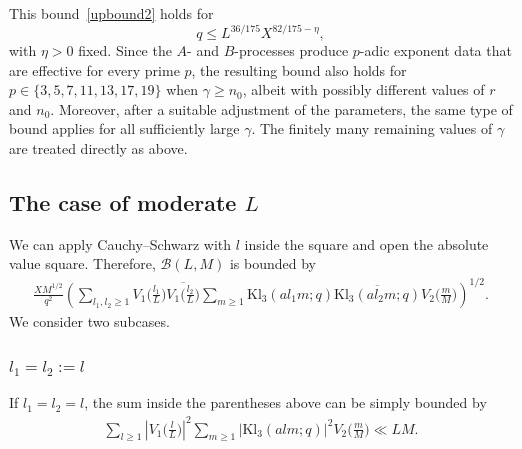 \documentclass[11pt,reqno]{amsart}
\newcommand{\bea}{\begin{eqnarray}}
\newcommand{\eea}{\end{eqnarray}}
\numberwithin{equation}{section}
\theoremstyle{plain}
\theoremstyle{definition}
\begin{document}
This bound~\eqref{upbound2} holds for
$$q \leq L^{36/175}X^{82/175-\eta},$$
with $\eta>0$ fixed.
Since the $A$- and $B$-processes produce $p$-adic exponent data that are effective for every prime $p$, 
the resulting bound also holds for $p\in\{3,5,7, 11, 13,17,19\}$ when $\gamma \geqslant n_0$, 
albeit with possibly different values of $r$ and $n_0$.
Moreover, after a suitable adjustment of the parameters, the same type of
bound applies for all sufficiently large $\gamma$. The finitely many
remaining values of $\gamma$ are treated directly as above.

\subsection{The case of moderate $L$}
We can apply Cauchy--Schwarz with $l$ inside the square and open the absolute value square. 
Therefore, $\mathcal{B}(L, M)$ is bounded by
\bea
\frac{XM^{1/2}}{q^2}\left(\sum_{l_1,l_2\geq 1}V_1\big(\frac{l_1}{L}\big)
\overline{V_1\big(\frac{l_2}{L}\big)}\sum_{m\geq 1}
\mathrm{Kl}_3(al_1 m;q)\overline{\mathrm{Kl}_3(al_2 m;q)}
V_2\big(\frac{m}{M}\big)\right)^{1/2}.\label{c-sum}
\eea
We consider two subcases.
\subsubsection{$l_1= l_2:=l$}
If $l_1= l_2=l$, the sum inside the parentheses above can be simply bounded by
\begin{equation}\label{l1=l2}
\begin{split}\sum_{l\geq 1}|V_1\big(\frac{l}{L}\big)|^2\sum_{m\geq 1}
|\mathrm{Kl}_3(al m;q)|^2V_2\big(\frac{m}{M}\big)\ll LM.
\end{split}\end{equation}
\end{document}
